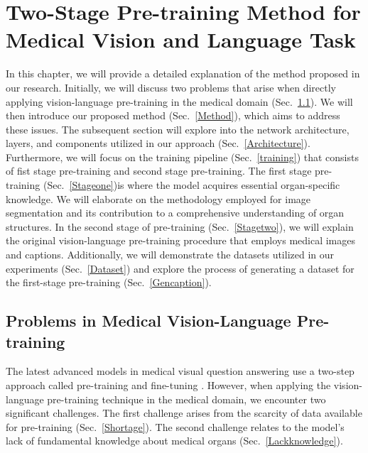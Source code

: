 \chapter{Two-Stage Pre-training Method for Medical Vision and Language Task}
\label{chapter:ch3}

In this chapter, we will provide a detailed explanation of the method proposed in our research. Initially, we will discuss two problems that arise when directly applying vision-language pre-training in the medical domain (Sec.~\ref{Problems}). We will then introduce our proposed method (Sec.~\ref{Method}), which aims to address these issues. The subsequent section will explore into the network architecture, layers, and components utilized in our approach (Sec.~\ref{Architecture}). Furthermore, we will focus on the training pipeline (Sec.~\ref{training}) that consists of fist stage pre-training and second stage pre-training. The first stage pre-training (Sec.~\ref{Stageone})is where the model acquires essential organ-specific knowledge. We will elaborate on the methodology employed for image segmentation and its contribution to a comprehensive understanding of organ structures. In the second stage of pre-training (Sec.~\ref{Stagetwo}), we will explain the original vision-language pre-training procedure that employs medical images and captions. Additionally, we will demonstrate the datasets utilized in our experiments (Sec.~\ref{Dataset}) and explore the process of generating a dataset for the first-stage pre-training (Sec.~\ref{Gencaption}).

\section{Problems in Medical Vision-Language Pre-training}
\label{Problems}
The latest advanced models in medical visual question answering use a two-step approach called pre-training and fine-tuning \cite{chen2022align, chen2023towards, moon2022multi, yan2022clinical, chen2022multi, Wang2022MedCLIPCL}. However, when applying the vision-language pre-training technique in the medical domain, we encounter two significant challenges. The first challenge arises from the scarcity of data available for pre-training (Sec.~\ref{Shortage}). The second challenge relates to the model's lack of fundamental knowledge about medical organs (Sec.~\ref{Lackknowledge}).

